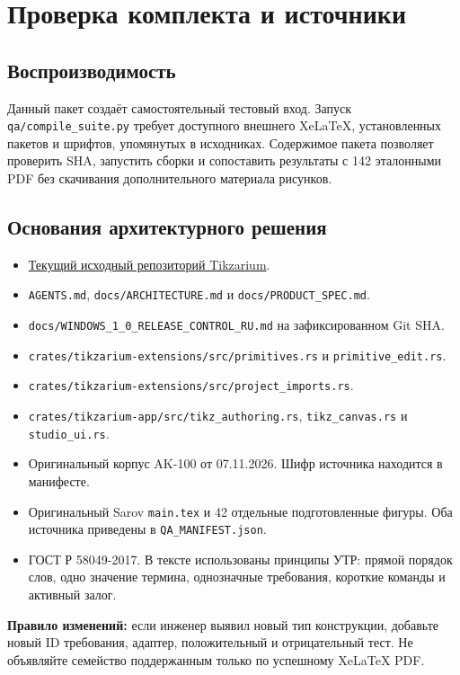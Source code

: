 \documentclass[11pt,a4paper,oneside]{scrreprt}
\providecommand{\tightlist}{\setlength{\itemsep}{0pt}\setlength{\parskip}{0pt}}
\begin{document}
\chapter{Проверка комплекта и источники}\label{ux43fux440ux43eux432ux435ux440ux43aux430-ux43aux43eux43cux43fux43bux435ux43aux442ux430-ux438-ux438ux441ux442ux43eux447ux43dux438ux43aux438}

\section{Воспроизводимость}\label{ux432ux43eux441ux43fux440ux43eux438ux437ux432ux43eux434ux438ux43cux43eux441ux442ux44c}

Данный пакет создаёт самостоятельный тестовый вход. Запуск \texttt{qa/compile\_suite.py} требует доступного внешнего XeLaTeX, установленных пакетов и шрифтов, упомянутых в исходниках. Содержимое пакета позволяет проверить SHA, запустить сборки и сопоставить результаты с 142 эталонными PDF без скачивания дополнительного материала рисунков.

\section{Основания архитектурного решения}\label{ux43eux441ux43dux43eux432ux430ux43dux438ux44f-ux430ux440ux445ux438ux442ux435ux43aux442ux443ux440ux43dux43eux433ux43e-ux440ux435ux448ux435ux43dux438ux44f}

\begin{itemize}
\tightlist
\item
  \href{https://github.com/i-shutov/tikzarium}{Текущий исходный репозиторий Tikzarium}.
\item
  \texttt{AGENTS.md}, \texttt{docs/ARCHITECTURE.md} и \texttt{docs/PRODUCT\_SPEC.md}.
\item
  \texttt{docs/WINDOWS\_1\_0\_RELEASE\_CONTROL\_RU.md} на зафиксированном Git SHA.
\item
  \texttt{crates/tikzarium-extensions/src/primitives.rs} и \texttt{primitive\_edit.rs}.
\item
  \texttt{crates/tikzarium-extensions/src/project\_imports.rs}.
\item
  \texttt{crates/tikzarium-app/src/tikz\_authoring.rs}, \texttt{tikz\_canvas.rs} и \texttt{studio\_ui.rs}.
\item
  Оригинальный корпус AK-100 от 07.11.2026. Шифр источника находится в манифесте.
\item
  Оригинальный Sarov \texttt{main.tex} и 42 отдельные подготовленные фигуры. Оба источника приведены в \texttt{QA\_MANIFEST.json}.
\item
  ГОСТ Р 58049-2017. В тексте использованы принципы УТР: прямой порядок слов, одно значение термина, однозначные требования, короткие команды и активный залог.
\end{itemize}

\textbf{Правило изменений:} если инженер выявил новый тип конструкции, добавьте новый ID требования, адаптер, положительный и отрицательный тест. Не объявляйте семейство поддержанным только по успешному XeLaTeX PDF.
\end{document}

